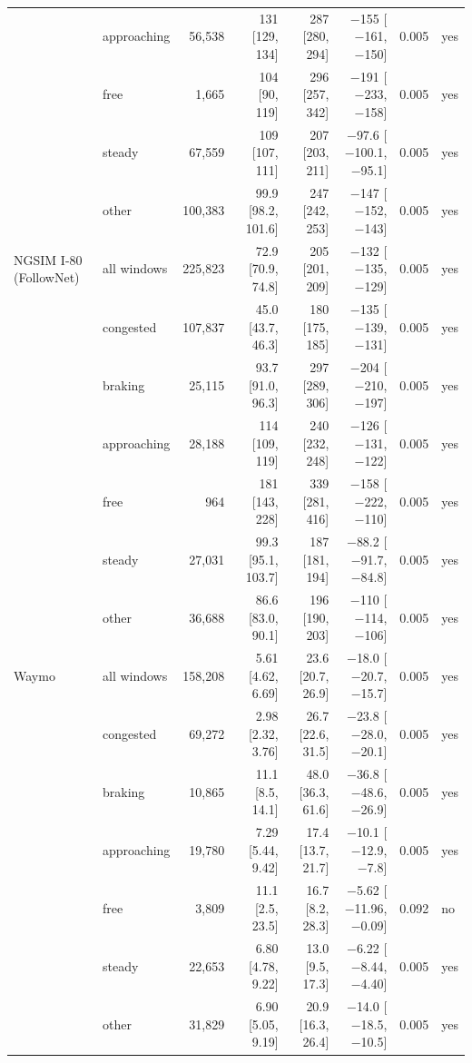 \begin{longtable}{llrrrrrl}
 & approaching & 56,538 & 131 [129, 134] & 287 [280, 294] & $-$155 [$-$161, $-$150] & 0.005 & yes \\
 & free & 1,665 & 104 [90, 119] & 296 [257, 342] & $-$191 [$-$233, $-$158] & 0.005 & yes \\
 & steady & 67,559 & 109 [107, 111] & 207 [203, 211] & $-$97.6 [$-$100.1, $-$95.1] & 0.005 & yes \\
 & other & 100,383 & 99.9 [98.2, 101.6] & 247 [242, 253] & $-$147 [$-$152, $-$143] & 0.005 & yes \\
\midrule
NGSIM I-80 (FollowNet) & all windows & 225,823 & 72.9 [70.9, 74.8] & 205 [201, 209] & $-$132 [$-$135, $-$129] & 0.005 & yes \\
 & congested & 107,837 & 45.0 [43.7, 46.3] & 180 [175, 185] & $-$135 [$-$139, $-$131] & 0.005 & yes \\
 & braking & 25,115 & 93.7 [91.0, 96.3] & 297 [289, 306] & $-$204 [$-$210, $-$197] & 0.005 & yes \\
 & approaching & 28,188 & 114 [109, 119] & 240 [232, 248] & $-$126 [$-$131, $-$122] & 0.005 & yes \\
 & free & 964 & 181 [143, 228] & 339 [281, 416] & $-$158 [$-$222, $-$110] & 0.005 & yes \\
 & steady & 27,031 & 99.3 [95.1, 103.7] & 187 [181, 194] & $-$88.2 [$-$91.7, $-$84.8] & 0.005 & yes \\
 & other & 36,688 & 86.6 [83.0, 90.1] & 196 [190, 203] & $-$110 [$-$114, $-$106] & 0.005 & yes \\
\midrule
Waymo & all windows & 158,208 & 5.61 [4.62, 6.69] & 23.6 [20.7, 26.9] & $-$18.0 [$-$20.7, $-$15.7] & 0.005 & yes \\
 & congested & 69,272 & 2.98 [2.32, 3.76] & 26.7 [22.6, 31.5] & $-$23.8 [$-$28.0, $-$20.1] & 0.005 & yes \\
 & braking & 10,865 & 11.1 [8.5, 14.1] & 48.0 [36.3, 61.6] & $-$36.8 [$-$48.6, $-$26.9] & 0.005 & yes \\
 & approaching & 19,780 & 7.29 [5.44, 9.42] & 17.4 [13.7, 21.7] & $-$10.1 [$-$12.9, $-$7.8] & 0.005 & yes \\
 & free & 3,809 & 11.1 [2.5, 23.5] & 16.7 [8.2, 28.3] & $-$5.62 [$-$11.96, $-$0.09] & 0.092 & no \\
 & steady & 22,653 & 6.80 [4.78, 9.22] & 13.0 [9.5, 17.3] & $-$6.22 [$-$8.44, $-$4.40] & 0.005 & yes \\
 & other & 31,829 & 6.90 [5.05, 9.19] & 20.9 [16.3, 26.4] & $-$14.0 [$-$18.5, $-$10.5] & 0.005 & yes \\

\end{longtable}
